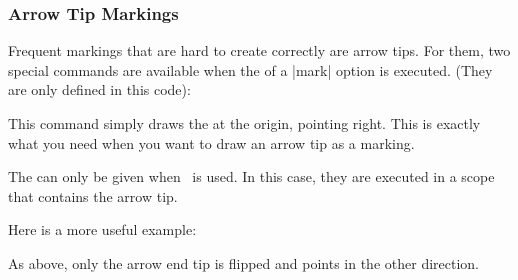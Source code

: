 \subsubsection{Arrow Tip Markings}

Frequent markings that are hard to create correctly are arrow tips. For them,
two special commands are available when the  of a |mark| option is
executed. (They are only defined in this code):

\begin{command}{\arrow{}}
    This command simply draws the  at the origin, pointing
    right. This is exactly what you need when you want to draw an arrow tip as
    a marking.

    The  can only be given when \tikzname\ is used. In this case,
    they are executed in a scope that contains the arrow tip.
\begin{codeexample}[preamble={\usetikzlibrary{decorations.markings}}]
\end{codeexample}

    Here is a more useful example:
\begin{codeexample}[preamble={\usetikzlibrary{decorations.markings}}]
\end{codeexample}
\end{command}

\begin{command}{\arrowreversed{}}
    As above, only the arrow end tip is flipped and points in the other
    direction.
\end{command}


